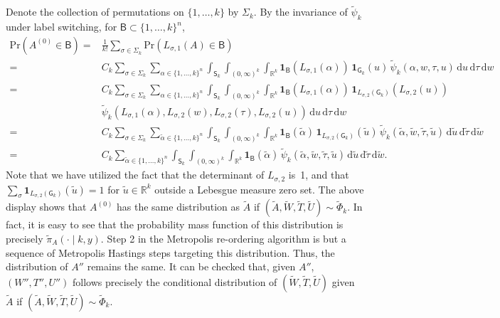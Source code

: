 \documentclass[12pt]{article}
\newcommand{\df}{\mathrm{d}}
\newcommand{\ind}{\mathbf{1}}
\begin{document}
Denote the collection of permutations on $\{1,\dots,k\}$ by $\Sigma_k$.
By the invariance of $\tilde{\psi}_k$ under label switching, for $\mathsf{B} \subset \{1,\dots,k\}^n$, 
\[
\begin{aligned}
	\mbox{Pr}(A^{(0)} \in \mathsf{B}) 
	=& \frac{1}{k!} \sum_{\sigma \in \Sigma_k} \mbox{Pr}(L_{\sigma,1}(A) \in \mathsf{B}) \\
	=&  C_k \sum_{\sigma \in \Sigma_k} \sum_{\alpha \in \{1,\dots,k\}^n} \int_{\mathsf{S}_k} \int_{(0,\infty)^k} \int_{\mathbb{R}^k} \ind_{\mathsf{B}}(L_{\sigma,1}(\alpha)) \, \ind_{\mathsf{G}_k}(u) \, \tilde{\psi}_k(\alpha, w, \tau, u) \, \df u \, \df \tau \, \df w \\
	=&  C_k \sum_{\sigma \in \Sigma_k} \sum_{\alpha \in \{1,\dots,k\}^n} \int_{\mathsf{S}_k} \int_{(0,\infty)^k} \int_{\mathbb{R}^k} \ind_{\mathsf{B}}(L_{\sigma,1}(\alpha)) \, \ind_{L_{\sigma,2}(\mathsf{G}_k)}(L_{\sigma,2}(u)) \\
	& \tilde{\psi}_k(L_{\sigma,1}(\alpha), L_{\sigma,2}(w), L_{\sigma,2}(\tau), L_{\sigma,2}(u)) \, \df u \, \df \tau \, \df w \\
	=&  C_k \sum_{\sigma \in \Sigma_k} \sum_{\tilde{\alpha} \in \{1,\dots,k\}^n} \int_{\mathsf{S}_k} \int_{(0,\infty)^k} \int_{\mathbb{R}^k} \ind_{\mathsf{B}}(\tilde{\alpha}) \, \ind_{L_{\sigma,2} (\mathsf{G}_k)}(\tilde{u}) \, \tilde{\psi}_k(\tilde{\alpha}, \tilde{w}, \tilde{\tau}, \tilde{u}) \, \df \tilde{u} \, \df \tilde{\tau} \, \df \tilde{w} \\
	=& C_k \sum_{\tilde{\alpha} \in \{1,\dots,k\}^n} \int_{\mathsf{S}_k} \int_{(0,\infty)^k} \int_{\mathbb{R}^k} \ind_{\mathsf{B}}(\tilde{\alpha}) \, \tilde{\psi}_k(\tilde{\alpha}, \tilde{w}, \tilde{\tau}, \tilde{u}) \, \df \tilde{u} \, \df \tilde{\tau} \, \df \tilde{w}.
\end{aligned}
\]
Note that we have utilized the fact that the determinant of $L_{\sigma,2}$ is~1, and that $\sum_{\sigma} \ind_{L_{\sigma,2}(\mathsf{G}_k)}(\tilde{u}) = 1$ for $\tilde{u} \in \mathbb{R}^k$ outside a Lebesgue measure zero set.
The above display shows that $A^{(0)}$ has the same distribution as $\tilde{A}$ if $(\tilde{A}, \tilde{W}, \tilde{T}, \tilde{U}) \sim \tilde{\Phi}_k$.
In fact, it is easy to see that the probability mass function of this distribution is precisely $\tilde{\pi}_A(\cdot \mid k, y)$.
Step 2 in the Metropolis re-ordering algorithm is but a sequence of Metropolis Hastings steps targeting this distribution.
Thus, the distribution of $A''$ remains the same.
It can be checked that, given $A''$,  $(W'', T'', U'')$ follows precisely the conditional distribution of $(\tilde{W}, \tilde{T}, \tilde{U})$ given $\tilde{A}$ if $(\tilde{A}, \tilde{W}, \tilde{T}, \tilde{U}) \sim \tilde{\Phi}_k$.
\end{document}
